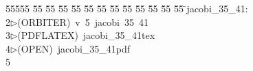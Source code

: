 %
%
\begin{tabbing}
55555 \= 55 \= 55 \= 55 \= 55 \= 55 \= 55 \= 55 \= 55 \= 55 \= 55 \= 55 \= 55 \= \>jacobi\_35\_41:\\[0pt]
2\>$\triangleright$\>(ORBITER)\ v\ 5\ jacobi\ 35\ 41\\[0pt]
3\>$\triangleright$\>(PDFLATEX)\ jacobi\_35\_41tex\\[0pt]
4\>$\triangleright$\>(OPEN)\ jacobi\_35\_41pdf\\[0pt]
5\>\end{tabbing}
